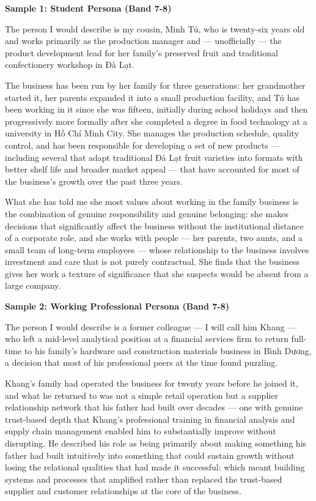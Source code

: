 \begin{ieltsanswer}
\textbf{Sample 1: Student Persona (Band 7-8)}

The person I would describe is my cousin, Minh Tú, who is twenty-six years old and works primarily as the production manager and — unofficially — the product development lead for her family's preserved fruit and traditional confectionery workshop in Đà Lạt.

The business has been run by her family for three generations: her grandmother started it, her parents expanded it into a small production facility, and Tú has been working in it since she was fifteen, initially during school holidays and then progressively more formally after she completed a degree in food technology at a university in Hồ Chí Minh City. She manages the production schedule, quality control, and has been responsible for developing a set of new products — including several that adapt traditional Đà Lạt fruit varieties into formats with better shelf life and broader market appeal — that have accounted for most of the business's growth over the past three years.

What she has told me she most values about working in the family business is the combination of genuine responsibility and genuine belonging: she makes decisions that significantly affect the business without the institutional distance of a corporate role, and she works with people — her parents, two aunts, and a small team of long-term employees — whose relationship to the business involves investment and care that is not purely contractual. She finds that the business gives her work a texture of significance that she suspects would be absent from a large company.

\textbf{Sample 2: Working Professional Persona (Band 7-8)}

The person I would describe is a former colleague — I will call him Khang — who left a mid-level analytical position at a financial services firm to return full-time to his family's hardware and construction materials business in Bình Dương, a decision that most of his professional peers at the time found puzzling.

Khang's family had operated the business for twenty years before he joined it, and what he returned to was not a simple retail operation but a supplier relationship network that his father had built over decades — one with genuine trust-based depth that Khang's professional training in financial analysis and supply chain management enabled him to substantially improve without disrupting. He described his role as being primarily about making something his father had built intuitively into something that could sustain growth without losing the relational qualities that had made it successful: which meant building systems and processes that amplified rather than replaced the trust-based supplier and customer relationships at the core of the business.


\end{ieltsanswer}
